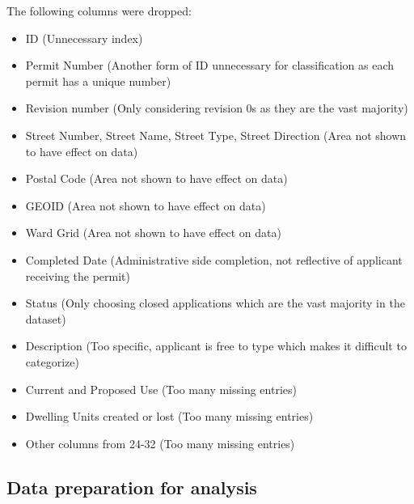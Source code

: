\documentclass{article}
\begin{document}
\newpage
The following columns were dropped: 
\begin{itemize}
    \item ID (Unnecessary index)
    \item Permit Number (Another form of ID unnecessary for classification as each permit has a unique number)
    \item Revision number (Only considering revision 0s as they are the vast majority)
    \item Street Number, Street Name, Street Type, Street Direction (Area not shown to have effect on data)
    \item Postal Code (Area not shown to have effect on data)
    \item GEOID (Area not shown to have effect on data)
    \item Ward Grid (Area not shown to have effect on data)
    \item Completed Date (Administrative side completion, not reflective of applicant receiving the permit)
    \item Status (Only choosing closed applications which are the vast majority in the dataset)
    \item Description (Too specific, applicant is free to type which makes it difficult to categorize)
    \item Current and Proposed Use (Too many missing entries)
    \item Dwelling Units created or lost (Too many missing entries)
    \item Other columns from 24-32 (Too many missing entries)
\end{itemize}


\subsection{Data preparation for analysis}
\end{document}
